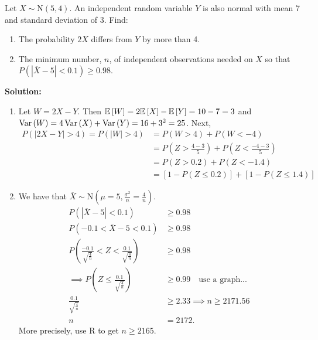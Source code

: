 \begin{example}
    Let $X \sim \text{N}(5,4)$. An independent random variable $Y$ is also normal with mean 7 and standard deviation of 3. Find:
    \begin{enumerate}[label=(\alph*)]
        \item The probability $2X$ differs from $Y$ by more than 4.
        \item The minimum number, $n$, of independent observations needed on $X$ so that $P(|\overline{X} -5| < 0.1) \geq 0.98$.
    \end{enumerate}
    \pagebreak

    \textbf{Solution:}
    \begin{enumerate}[label=(\alph*)]
        \item Let $W = 2X - Y$. Then $\mathbb{E}\left[{W}\right] = 2\mathbb{E}\left[{X}\right] - \mathbb{E}\left[{Y}\right] = 10 - 7 = 3$ and $\operatorname{Var}\left({W}\right) = 4\operatorname{Var}\left({X}\right) + \operatorname{Var}\left({Y}\right) = 16 + 3^2 = 25$. Next, \vspace{-3mm}
        \begin{align*}
            P(|2X - Y|> 4) = P(|W|>4) &= P(W>4) + P(W<-4) \\
            &= P(Z > \frac{4-3}{5}) + P(Z < \frac{-4-3}{5}) \\
            &= P(Z > 0.2) + P(Z < -1.4) \\
            &= \left[ 1 - P(Z \leq 0.2) \right] + \left[ 1 - P(Z \leq 1.4) \right]
        \end{align*}
        \item We have that $\overline{X} \sim \text{N}(\mu = 5, \frac{\sigma^2}{n} = \frac{4}{n})$. 
        \begin{align*}
            P(|\overline{X} -5| < 0.1) &\geq 0.98 \\
            P(-0.1 < \overline{X} - 5 < 0.1) &\geq 0.98 \\
            P(\frac{-0.1}{\sqrt{\frac{4}{n}}} < Z < \frac{0.1}{\sqrt{\frac{4}{n}}}) &\geq 0.98 \\
            \implies P(Z \leq \frac{0.1}{\sqrt{\frac{4}{n}}}) &\geq 0.99 \quad \text{use a graph...} \\
            \frac{0.1}{\sqrt{\frac{4}{n}}} &\geq 2.33 \implies n \geq 2171.56 \\
            n &= 2172.
        \end{align*}
        More precisely, use R to get $n \geq 2165$.
    \end{enumerate}
\end{example}


\pagebreak

